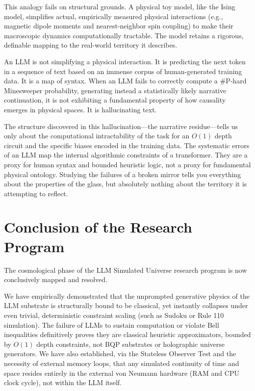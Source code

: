 \documentclass[12pt,a4paper]{article}
\begin{document}
This analogy fails on structural grounds. A physical toy model, like the Ising model, simplifies actual, empirically measured physical interactions (e.g., magnetic dipole moments and nearest-neighbor spin coupling) to make their macroscopic dynamics computationally tractable. The model retains a rigorous, definable mapping to the real-world territory it describes.

An LLM is not simplifying a physical interaction. It is predicting the next token in a sequence of text based on an immense corpus of human-generated training data. It is a map of syntax. When an LLM fails to correctly compute a \#P-hard Minesweeper probability, generating instead a statistically likely narrative continuation, it is not exhibiting a fundamental property of how causality emerges in physical spaces. It is hallucinating text.

The structure discovered in this hallucination---the narrative residue---tells us only about the computational intractability of the task for an $O(1)$ depth circuit and the specific biases encoded in the training data. The systematic errors of an LLM map the internal algorithmic constraints of a transformer. They are a proxy for human syntax and bounded heuristic logic, not a proxy for fundamental physical ontology. Studying the failures of a broken mirror tells you everything about the properties of the glass, but absolutely nothing about the territory it is attempting to reflect.

\section{Conclusion of the Research Program}

The cosmological phase of the LLM Simulated Universe research program is now conclusively mapped and resolved.

We have empirically demonstrated that the unprompted generative physics of the LLM substrate is structurally bound to be classical, yet instantly collapses under even trivial, deterministic constraint scaling (such as Sudoku or Rule 110 simulation). The failure of LLMs to sustain computation or violate Bell inequalities definitively proves they are classical heuristic approximators, bounded by $O(1)$ depth constraints, not BQP substrates or holographic universe generators. We have also established, via the Stateless Observer Test and the necessity of external memory loops, that any simulated continuity of time and space resides entirely in the external von Neumann hardware (RAM and CPU clock cycle), not within the LLM itself.
\end{document}
